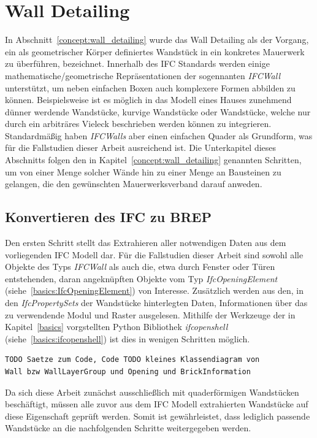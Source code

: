 \section{Wall Detailing}
In Abschnitt~\ref{concept:wall_detailing} wurde das Wall Detailing als der Vorgang, ein als geometrischer Körper definiertes Wandstück in ein konkretes Mauerwerk zu überführen, bezeichnet.
Innerhalb des IFC Standards werden einige mathematische/geometrische Repräsentationen der sogennanten \textit{IFCWall} unterstützt, um neben einfachen Boxen auch komplexere Formen abbilden zu können.
Beispielsweise ist es möglich in das Modell eines Hauses zunehmend dünner werdende Wandstücke, kurvige Wandstücke oder Wandstücke, welche nur durch ein arbiträres Vieleck beschrieben werden können zu integrieren.
Standardmäßig haben \textit{IFCWalls} aber einen einfachen Quader als Grundform, was für die Fallstudien dieser Arbeit ausreichend ist.
Die Unterkapitel dieses Abschnitts folgen den in Kapitel~\ref{concept:wall_detailing} genannten Schritten, um von einer Menge solcher Wände hin zu einer Menge an Bausteinen zu gelangen, die den gewünschten Mauerwerksverband darauf anweden.

\subsection{Konvertieren des IFC zu BREP}
Den ersten Schritt stellt das Extrahieren aller notwendigen Daten aus dem vorliegenden IFC Modell dar.
Für die Fallstudien dieser Arbeit sind sowohl alle Objekte des Typs \textit{IFCWall} als auch die, etwa durch Fenster oder Türen entstehenden, daran angeknüpften Objekte vom Typ \textit{IfcOpeningElement} (siehe~\ref{basics:IfcOpeningElement}) von Interesse.
Zusätzlich werden aus den, in den \textit{IfcPropertySets} der Wandstücke hinterlegten Daten, Informationen über das zu verwendende Modul und Raster ausgelesen.
Mithilfe der Werkzeuge der in Kapitel~\ref{basics} vorgstellten Python Bibliothek \textit{ifcopenshell} (siehe~\ref{basics:ifcopenshell}) ist dies in wenigen Schritten möglich.

\begin{lstlisting}[language=Python, caption=Extraktion relevanter Informtionen aus einem IFC-File.]
TODO Saetze zum Code, Code TODO kleines Klassendiagram von 
Wall bzw WallLayerGroup und Opening und BrickInformation
\end{lstlisting}

Da sich diese Arbeit zunächst ausschließlich mit quaderförmigen Wandstücken beschäftigt, müssen alle zuvor aus dem IFC Modell extrahierten Wandstücke auf diese Eigenschaft geprüft werden.
Somit ist gewährleistet, dass lediglich passende Wandstücke an die nachfolgenden Schritte weitergegeben werden.


